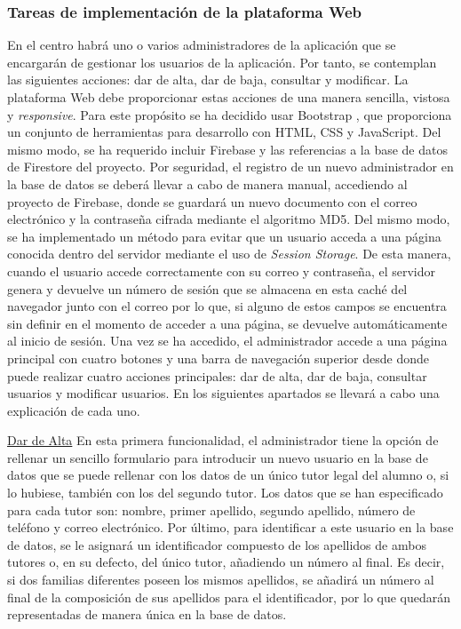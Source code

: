 \subsubsection{Tareas de implementación de la plataforma Web}
En el centro habrá uno o varios administradores de la aplicación que se encargarán de gestionar los usuarios de la aplicación. Por tanto, se contemplan las siguientes acciones: dar de alta, dar de baja, consultar y modificar. La plataforma Web debe proporcionar estas acciones de una manera sencilla, vistosa y \textit{responsive}. Para este propósito se ha decidido usar Bootstrap \cite{Bootstrap}, que proporciona un conjunto de herramientas para desarrollo con HTML, CSS y JavaScript. Del mismo modo, se ha requerido incluir Firebase y las referencias a la base de datos de Firestore del proyecto. Por seguridad, el registro de un nuevo administrador en la base de datos se deberá llevar a cabo de manera manual, accediendo al proyecto de Firebase, donde se guardará un nuevo documento con el correo electrónico y la contraseña cifrada mediante el algoritmo MD5. Del mismo modo, se ha implementado un método para evitar que un usuario acceda a una página conocida dentro del servidor mediante el uso de \textit{Session Storage}. De esta manera, cuando el usuario accede correctamente con su correo y contraseña, el servidor genera y devuelve un número de sesión que se almacena en esta caché del navegador junto con el correo por lo que, si alguno de estos campos se encuentra sin definir en el momento de acceder a una página, se devuelve automáticamente al inicio de sesión. Una vez se ha accedido, el administrador accede a una página principal con cuatro botones y una barra de navegación superior desde donde puede realizar cuatro acciones principales: dar de alta, dar de baja, consultar usuarios y modificar usuarios. En los siguientes apartados se llevará a cabo una explicación de cada uno.

\noindent \underline{Dar de Alta} \newline
En esta primera funcionalidad, el administrador tiene la opción de rellenar un sencillo formulario para introducir un nuevo usuario en la base de datos que se puede rellenar con los datos de un único tutor legal del alumno o, si lo hubiese, también con los del segundo tutor. Los datos que se han especificado para cada tutor son: nombre, primer apellido, segundo apellido, número de teléfono y correo electrónico. Por último, para identificar a este usuario en la base de datos, se le asignará un identificador compuesto de los apellidos de ambos tutores o, en su defecto, del único tutor, añadiendo un número al final. Es decir, si dos familias diferentes poseen los mismos apellidos, se añadirá un número al final de la composición de sus apellidos para el identificador, por lo que quedarán representadas de manera única en la base de datos.

